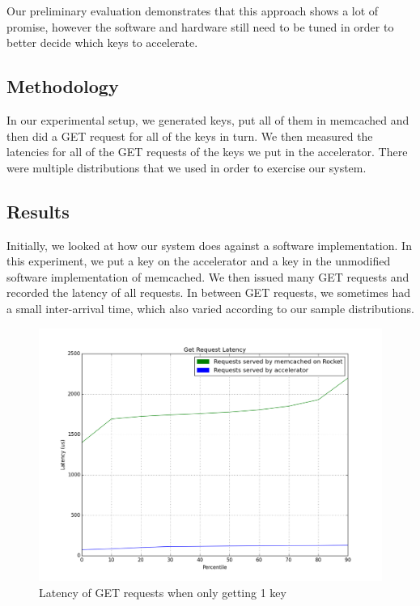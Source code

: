 Our preliminary evaluation demonstrates that this approach shows a lot of
promise, however the software and hardware still need to be tuned in order to
better decide which keys to accelerate.

\subsection{Methodology}

In our experimental setup, we generated keys, put all of them in memcached and
then did a GET request for all of the keys in turn. We then measured the
latencies for all of the GET requests of the keys we put in the accelerator.
There were multiple distributions that we used in order to exercise our system.

\subsection{Results}

Initially, we looked at how our system does against a software implementation.
In this experiment, we put a key on the accelerator and a key in the unmodified
software implementation of memcached. We then issued many GET requests and
recorded the latency of all requests. In between GET requests, we sometimes had
a small inter-arrival time, which also varied according to our sample
distributions.

\begin{figure}[t]
\begin{center}
\includegraphics[width=\linewidth]{graph.png}
\caption{Latency of GET requests when only getting 1 key}
\label{fig:one-req}
\end{center}
\end{figure}

